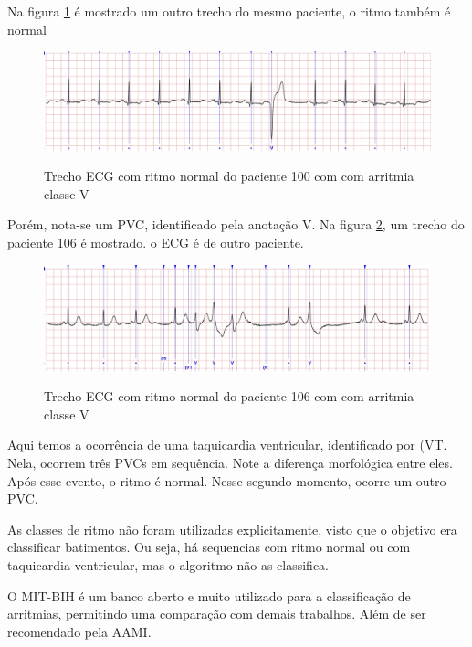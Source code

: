 Na figura \ref{fig:p100_ritmo_normal_arrV} é mostrado um outro trecho do mesmo paciente, o ritmo também é normal

\begin{figure}[H]
  \centering
  \caption{Trecho ECG com ritmo normal do paciente 100 com com arritmia classe V}
  \includegraphics[width=\linewidth]{figuras/ecg_physio_bank/p100_ritmo_normal_classV.png}  %
  \label{fig:p100_ritmo_normal_arrV}
\end{figure}

Porém, nota-se um PVC, identificado pela anotação V. Na figura \ref{fig:p106_ritmo_normal_arrV}, um trecho do paciente 106 é mostrado.
o ECG é de outro paciente.

\begin{figure}[H]
  \centering
  \caption{Trecho ECG com ritmo normal do paciente 106 com com arritmia classe V}
  \includegraphics[width=\linewidth]{figuras/ecg_physio_bank/p106_ritmo_normal_vt_classV.png}  %
  \label{fig:p106_ritmo_normal_arrV}
\end{figure}

Aqui temos a ocorrência de uma taquicardia ventricular, identificado por (VT. Nela, ocorrem três PVCs em sequência. 
Note a diferença morfológica entre eles. Após esse evento, o ritmo é normal. Nesse segundo momento, ocorre um outro PVC.

As classes de ritmo não foram utilizadas explicitamente, visto que o objetivo era classificar batimentos. Ou seja, há sequencias 
com ritmo normal ou com taquicardia ventricular, mas o algoritmo não as classifica.

O MIT-BIH é um banco aberto e muito utilizado para a classificação de arritmias, permitindo uma comparação com demais trabalhos.
Além de ser recomendado pela AAMI.

